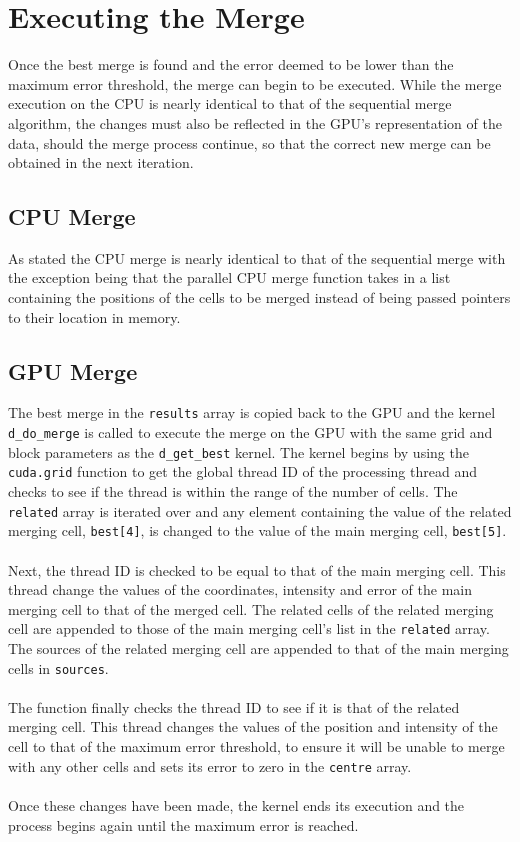 \section{Executing the Merge}
Once the best merge is found and the error deemed to be lower than the maximum error threshold, the merge can begin to be executed. While the merge execution on the CPU is nearly identical to that of the sequential merge algorithm, the changes must also be reflected in the GPU's representation of the data, should the merge process continue, so that the correct new merge can be obtained in the next iteration.

\subsection{CPU Merge}
As stated the CPU merge is nearly identical to that of the sequential merge with the exception being that the parallel CPU merge function takes in a list containing the positions of the cells to be merged instead of being passed pointers to their location in memory.

\subsection{GPU Merge}
The best merge in the \texttt{results} array is copied back to the GPU and the kernel \texttt{d\_do\_merge} is called to execute the merge on the GPU with the same grid and block parameters as the \texttt{d\_get\_best} kernel. The kernel begins by using the \texttt{cuda.grid} function to get the global thread ID of the processing thread and checks to see if the thread is within the range of the number of cells. The \texttt{related} array is iterated over and any element containing the value of the related merging cell, \texttt{best[4]}, is changed to the value of the main merging cell, \texttt{best[5]}.
\\
\\
Next, the thread ID is checked to be equal to that of the main merging cell. This thread change the values of the coordinates, intensity and error of the main merging cell to that of the merged cell. The related cells of the related merging cell are appended to those of the main merging cell's list in the \texttt{related} array. The sources of the related merging cell are appended to that of the main merging cells in \texttt{sources}.
\\
\\
The function finally checks the thread ID to see if it is that of the related merging cell. This thread changes the values of the position and intensity of the cell to that of the maximum error threshold, to ensure it will be unable to merge with any other cells and sets its error to zero in the \texttt{centre} array.
\\
\\
Once these changes have been made, the kernel ends its execution and the process begins again until the maximum error is reached.